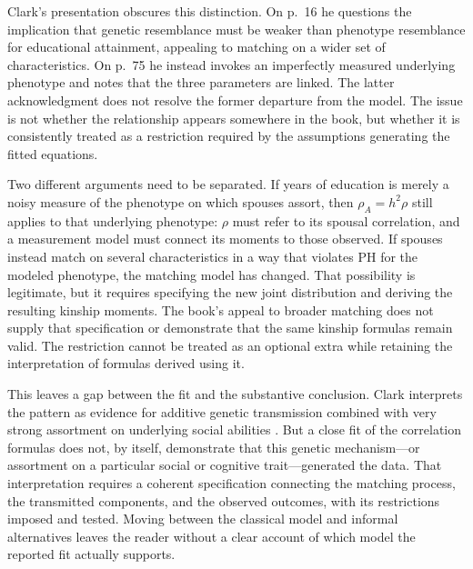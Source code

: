 Clark's presentation obscures this distinction. On p.~16 he questions
the implication that genetic resemblance must be weaker than phenotype
resemblance for educational attainment, appealing to matching on a wider
set of characteristics. On p.~75 he instead invokes an imperfectly
measured underlying phenotype and notes that the three parameters are
linked. The latter acknowledgment does not resolve the former departure
from the model. The issue is not whether the relationship appears
somewhere in the book, but whether it is consistently treated as a
restriction required by the assumptions generating the fitted equations.

Two different arguments need to be separated. If years of education
is merely a noisy measure of the phenotype on which spouses assort,
then $\rho_A=h^2\rho$ still applies to that underlying phenotype:
$\rho$ must refer to its spousal correlation, and a measurement model
must connect its moments to those observed. If spouses instead match
on several characteristics in a way that violates PH for the modeled
phenotype, the matching model has changed. That possibility is legitimate,
but it requires specifying the new joint distribution and deriving the
resulting kinship moments. The book's appeal to broader matching does
not supply that specification or demonstrate that the same kinship
formulas remain valid. The restriction cannot be treated as an optional
extra while retaining the interpretation of formulas derived using it.

This leaves a gap between the fit and the substantive conclusion.
Clark interprets the pattern as evidence for additive genetic
transmission combined with very strong assortment on underlying social
abilities \citep[pp.~16,75,286 and Technical Appendix]{Clark2026}.
But a close fit of the correlation formulas does not, by itself,
demonstrate that this genetic mechanism---or assortment on a particular
social or cognitive trait---generated the data. That interpretation
requires a coherent specification connecting the matching process,
the transmitted components, and the observed outcomes, with its
restrictions imposed and tested. Moving between the classical model
and informal alternatives leaves the reader without a clear account
of which model the reported fit actually supports.

